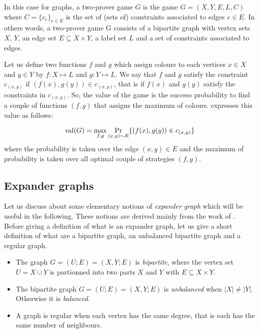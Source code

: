 In this case for graphs, a two-prover game $G$ is the game $G=(X,Y,E,L,C)$ where $C=\{c_e\}_{e\in E}$ is the set of (sets of) constraints associated to edges $e \in E$.
In others words, a two-prover game G consists of a bipartite graph with vertex
sets $X$, $Y$, an edge set $ E \subseteq X \times Y$, a label set $L$ and a set of constraints associated to edges.


Let us define two functions $f$ and $g$ which assign colours to each vertices  $x \in X$ and $y \in Y$ by $f: X\longmapsto L$ and $g: Y\longmapsto L$. We say that $f$ and $g$ satisfy the constraint $c_{(x,y)}$ if $(f(x),g(y)) \in c_{(x,y)}$, that is if $f(x)$ and $g(y)$ satisfy the constraints in $c_{(x,y)}$. So, the value of the game is the success probability to find a couple of functions $(f,g)$ that assigns the maximum of colours.
\cite{tamaki2015parallel} expresses this value as follows:
 
 $$\mathrm{val} (G)=\max_{f,g}\underset{(x,y)\sim E}\Pr  \{(f(x),g(y)) \in c_{(x,y)} \}$$
where the probability is taken over the edge $(x,y) \in E$ and the maximum of probability is taken over all optimal couple of strategies $(f,g).$

\subsection{Expander graphs}

 Let us discuss about some elementary notions of \textit{expander graph}  which will be useful in the following. These notions are derived mainly from the work of  \cite{raz2012strong}. Before giving a definition of what is an expander graph, let us give a short definition of what are a bipartite graph, an unbalanced bipartite graph and a regular graph.
 
\begin{itemize}
\item  The graph $G=(U;E)=(X,Y;E)$ is \emph{bipartite}, where the vertex set $U=X \cup Y$ is partionned
  into two parts $X$ and $Y$ with $ E\subseteq X\times Y$.
\item The bipartite graph $G=(U;E)=(X,Y;E)$ is \emph{unbalanced} when $|X| \neq |Y|$. Otherwise
  it is \emph{balanced.}
\item A graph is regular when each vertex has the same degree, that is each has the same number of neighbours.
\end{itemize}
 
